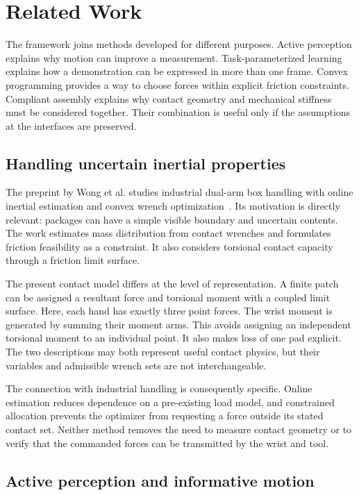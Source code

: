 \chapter{Related Work}
\label{ch:related}

The framework joins methods developed for different purposes. Active perception explains why motion can improve a measurement. Task-parameterized learning explains how a demonstration can be expressed in more than one frame. Convex programming provides a way to choose forces within explicit friction constraints. Compliant assembly explains why contact geometry and mechanical stiffness must be considered together. Their combination is useful only if the assumptions at the interfaces are preserved.

\section{Handling uncertain inertial properties}

The preprint by Wong et al. studies industrial dual-arm box handling with online inertial estimation and convex wrench optimization~\cite{wong2026}. Its motivation is directly relevant: packages can have a simple visible boundary and uncertain contents. The work estimates mass distribution from contact wrenches and formulates friction feasibility as a constraint. It also considers torsional contact capacity through a friction limit surface.

The present contact model differs at the level of representation. A finite patch can be assigned a resultant force and torsional moment with a coupled limit surface. Here, each hand has exactly three point forces. The wrist moment is generated by summing their moment arms. This avoids assigning an independent torsional moment to an individual point. It also makes loss of one pad explicit. The two descriptions may both represent useful contact physics, but their variables and admissible wrench sets are not interchangeable.

The connection with industrial handling is consequently specific. Online estimation reduces dependence on a pre-existing load model, and constrained allocation prevents the optimizer from requesting a force outside its stated contact set. Neither method removes the need to measure contact geometry or to verify that the commanded forces can be transmitted by the wrist and tool.

\section{Active perception and informative motion}

